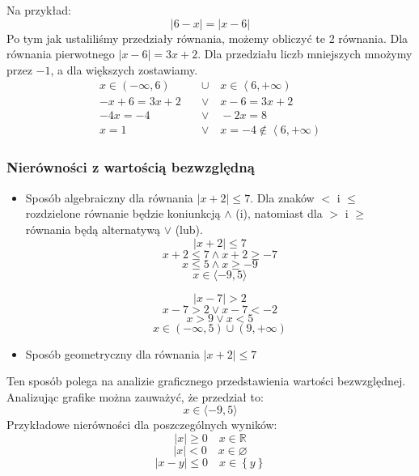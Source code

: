 \documentclass[12pt, a4paper]{article}
\begin{document}
Na przykład:
$$\left|6-x\right|=\left|x-6\right|$$
Po tym jak ustaliliśmy przedziały równania, możemy obliczyć te 2 równania.
Dla równania pierwotnego $\left|x-6\right|=3x+2$.
Dla przedziału liczb mniejszych mnożymy przez $-1$, a dla większych zostawiamy.
\begin{align*}
x \in \left( -\infty , 6\right) \quad & \cup \quad x \in \left\langle 6, +\infty \right) \\
-x+6=3x+2 \quad & \vee \quad x-6=3x+2 \\
-4x = -4 \quad & \vee \quad -2x = 8 \\
x = 1 \quad & \vee \quad x = -4 \notin \left\langle6, +\infty\right)
\end{align*}


\subsubsection*{Nierówności z wartością bezwzględną}
\begin{itemize}
  \item Sposób algebraiczny dla równania $\left|x + 2\right| \leq 7$. Dla znaków $<$ i $\leq$ rozdzielone równanie będzie
    koniunkcją $\wedge$ (i), natomiast dla $>$ i $\geq$ równania będą alternatywą $\vee$ (lub).
      $$\left| x+2 \right| \leq 7$$
      $$x+2 \leq 7 \wedge x+2\geq -7$$
      $$x \leq 5 \wedge x \geq -9$$
      $$x \in \langle -9,5 \rangle$$

      $$\left| x-7 \right| > 2$$
      $$x-7 > 2 \vee x-7 < -2$$
      $$x > 9 \vee x < 5$$
      $$x \in \left(-\infty, 5\right) \cup \left(9, +\infty \right)$$
  \item Sposób geometryczny dla równania $\left|x + 2\right| \leq 7$
    \begin{center}
    \end{center}
\end{itemize}
Ten sposób polega na analizie graficznego przedstawienia wartości bezwzględnej. Analizując grafike można zauważyć, że przedział to:
$$x \in \langle-9, 5\rangle$$
Przykładowe nierówności dla poszczególnych wyników:
$$\left|x\right|\geq0 \quad x \in \mathbb{R}$$
$$\left|x\right|<0 \quad x \in \varnothing$$
$$\left|x - y\right|\leq0 \quad x \in \left\{y\right\}$$
\end{document}
